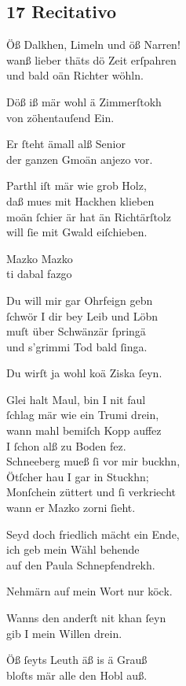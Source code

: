 \documentclass{ees}
\newenvironment{lyrics}[1]{%
  \subsection{#1}\nopagebreak%
  \begin{lyricslist}%
  \let\voice\item%
}{%
  \end{lyricslist}%
}
\begin{document}
\begin{lyrics}{17 Recitativo}
  \voice[Barthlme]
  Öß Dalkhen, Limeln und öß Narren!\\
  wanß lieber thäts dö Zeit erſpahren\\
  und bald oän Richter wöhln.

  \voice[Schnepfendrekh]
  Döß iß mär wohl ä Zimmerſtokh\\
  von zöhentauſend Ein.

  \voice[Schullmeiſter]
  Er ſteht ämall alß Senior\\
  der ganzen Gmoän anjezo vor.

  \voice[Mazko]
  Parthl iſt mär wie grob Holz,\\
  daß mues mit Hackhen klieben\\
  moän ſchier är hat än Richtärſtolz\\
  will ſie mit Gwald eiſchieben.

  \voice[Barthlme]
  Mazko Mazko\\
  ti dabal fazgo

  \voice[Mazko]
  Du will mir gar Ohrfeign gebn\\
  ſchwör I dir bey Leib und Löbn\\
  muſt über Schwänzär ſpringä\\
  und s’grimmi Tod bald ſinga.

  \voice[Barthlme]
  Du wirſt ja wohl koä Ziska ſeyn.

  \voice[Mazko]
  Glei halt Maul, bin I nit faul\\
  ſchlag mär wie ein Trumi drein,\\
  wann mahl bemiſch Kopp auffez\\
  I ſchon alß zu Boden fez.\\
  Schneeberg mueß ſi vor mir buckhn,\\
  Ötſcher hau I gar in Stuckhn;\\
  Monſchein züttert und ſi verkriecht\\
  wann er Mazko zorni ſieht.

  \voice[Schwabnwürth]
  Seyd doch friedlich mächt ein Ende,\\
  ich geb mein Wähl behende\\
  auf den Paula Schnepfendrekh.

  \voice[Mazko]
  Nehmärn auf mein Wort nur köck.

  \voice[Schullmeiſter]
  Wanns den anderſt nit khan ſeyn\\
  gib I mein Willen drein.

  \voice[Barthlme]
  Öß ſeyts Leuth äß is ä Grauß\\
  bloſts mär alle den Hobl auß.
\end{lyrics}
\end{document}
